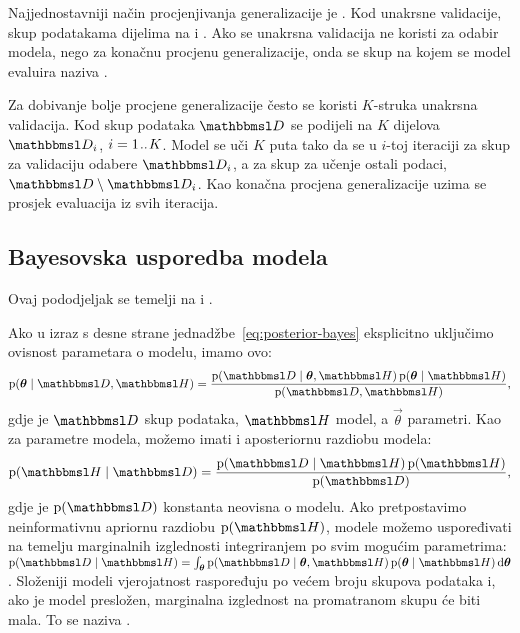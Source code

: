 \documentclass[utf8, diplomski, lmodern]{fer}
\begin{document}
Najjednostavniji način procjenjivanja generalizacije je . Kod unakrsne validacije, skup podatakama dijelima na  i . Ako se unakrsna validacija ne koristi za odabir modela, nego za konačnu procjenu generalizacije, onda se skup na kojem se model evaluira naziva .

Za dobivanje bolje procjene generalizacije često se koristi $K$-struka unakrsna validacija. Kod  skup podataka $\set D$ se podijeli na $K$ dijelova $\set D_i$, $i=1\mkern1.5mu{..}\mkern1.5mu K$. Model se uči $K$ puta tako da se u $i$-toj iteraciji za skup za validaciju odabere $\set D_i$, a za skup za učenje ostali podaci, $\set D\setminus\set D_i$. Kao konačna procjena generalizacije uzima se prosjek evaluacija iz svih iteracija.


\subsection{Bayesovska usporedba modela}

Ovaj pododjeljak se temelji na \cite{Murray:2005:NEBOR} i \cite[odjeljak 5.3]{Murphy:2012:MLPP}.

Ako u izraz s desne strane jednadžbe~\ref{eq:posterior-bayes} eksplicitno uključimo ovisnost parametara o modelu, imamo ovo:
\begin{align}
\p(\vec\theta\mid\set D,\set H) 
= \frac{\p(\set{D}\mid\vec\theta,\set H)\p(\vec\theta\mid\set H)}{\p(\set D,\set H)} \text{,}
\end{align}
gdje je $\set D$ skup podataka, $\set H$ model, a $\vec\theta$ parametri. Kao za parametre modela, možemo imati i aposteriornu razdiobu modela:
\begin{align}
\p(\set H\mid\set D) 
= \frac{\p(\set{D}\mid\set H)\p(\set H)}{\p(\set D)} \text{,}
\end{align}
gdje je $\p(\set D)$ konstanta neovisna o modelu. Ako pretpostavimo neinformativnu apriornu razdiobu $\p(\set H)$, modele možemo uspoređivati na temelju marginalnih izglednosti integriranjem po svim mogućim parametrima: $\p(\set{D}\mid\set H)=\int_{\vec\theta}\p(\set{D}\mid\vec\theta,\set H)\p(\vec\theta\mid\set H)\dif\vec\theta$. Složeniji modeli vjerojatnost raspoređuju po većem broju skupova podataka i, ako je model presložen, marginalna izglednost na promatranom skupu će biti mala. To se naziva  \citep{MacKay:1992:BMAM}.
\end{document}
